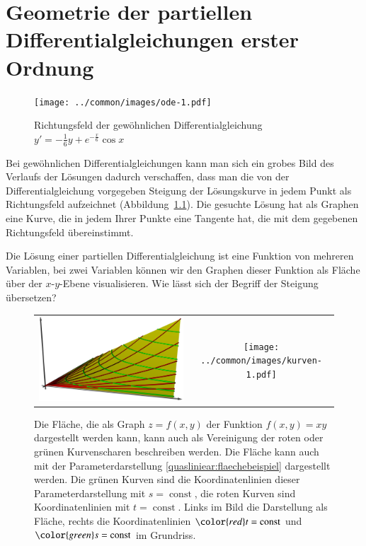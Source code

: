%
%
%
\chapter{Geometrie der partiellen Differentialgleichungen erster Ordnung\label{chapter-geometrie}}
\begin{figure}
\begin{center}
\texttt{[image: ../common/images/ode-1.pdf]}
\end{center}
\caption{Richtungsfeld der gewöhnlichen Differentialgleichung
$y'=-\frac16y+e^{-\frac{x}6}\cos x$ \label{geometrie:ode}}
\end{figure}
Bei gewöhnlichen Differentialgleichungen kann man sich ein grobes
Bild des Verlaufs der Lösungen dadurch verschaffen, dass man
die von der Differentialgleichung vorgegeben Steigung der Lösungskurve
in jedem Punkt als Richtungsfeld aufzeichnet (Abbildung~\ref{geometrie:ode}).
Die gesuchte Lösung hat als Graphen eine Kurve, die in jedem Ihrer Punkte eine
Tangente hat, die mit dem gegebenen Richtungsfeld übereinstimmt.

Die Lösung einer
partiellen Differentialgleichung ist eine Funktion von mehreren Variablen,
bei zwei Variablen können wir den Graphen dieser Funktion als Fläche
über der $x$-$y$-Ebene visualisieren. Wie lässt sich der Begriff der
Steigung übersetzen?

\begin{figure}
\centering
\begin{tabular}{cc}
\includegraphics[width=0.6\hsize]{../common/3d/surface.jpg}&%
\texttt{[image: ../common/images/kurven-1.pdf]}
\end{tabular}
\caption{Die Fläche, die als Graph $z=f(x,y)$ der Funktion $f(x,y)=xy$ 
dargestellt werden kann, kann auch als Vereinigung der roten oder grünen
Kurvenscharen beschreiben werden.
Die Fläche kann auch mit der Parameterdarstellung
\eqref{quasliniear:flaechebeispiel}
dargestellt werden.
Die grünen Kurven sind die Koordinatenlinien dieser Parameterdarstellung
mit $s=\operatorname{const}$,
die roten Kurven sind Koordinatenlinien mit $t=\operatorname{const}$.
Links im Bild die Darstellung als Fläche, rechts die Koordinatenlinien
${\color{red}t}=\operatorname{const}$
und
${\color{green}s}=\operatorname{const}$
im Grundriss.
\label{quasilinear:flaechenalskurven}
}
\end{figure}


